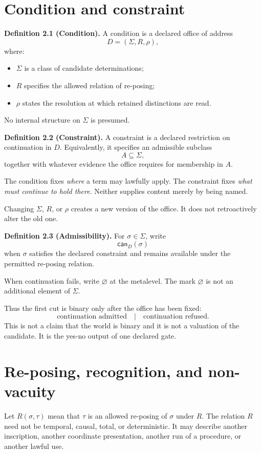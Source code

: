 \documentclass[11pt]{article}
\newcommand{\can}{\mathsf{can}}
\newcommand{\Refuse}{\varnothing}
\begin{document}
\section{Condition and constraint}

\textbf{Definition 2.1 (Condition).}
A condition is a declared office of address
\[
D=(\Sigma,R,\rho),
\]
where:
\begin{itemize}
\item $\Sigma$ is a class of candidate determinations;
\item $R$ specifies the allowed relation of re-posing;
\item $\rho$ states the resolution at which retained distinctions are read.
\end{itemize}
No internal structure on $\Sigma$ is presumed.

\textbf{Definition 2.2 (Constraint).}
A constraint is a declared restriction on continuation in $D$. Equivalently, it specifies an admissible subclass
\[
A\subseteq\Sigma,
\]
together with whatever evidence the office requires for membership in $A$.

The condition fixes \emph{where} a term may lawfully apply. The constraint fixes \emph{what must continue to hold there}. Neither supplies content merely by being named.

Changing $\Sigma$, $R$, or $\rho$ creates a new version of the office. It does not retroactively alter the old one.

\textbf{Definition 2.3 (Admissibility).}
For $\sigma\in\Sigma$, write
\[
\can_D(\sigma)
\]
when $\sigma$ satisfies the declared constraint and remains available under the permitted re-posing relation.

When continuation fails, write $\Refuse$ at the metalevel. The mark $\Refuse$ is not an additional element of $\Sigma$.

Thus the first cut is binary only after the office has been fixed:
\[
\boxed{\text{continuation admitted}\quad|\quad\text{continuation refused}.}
\]
This is not a claim that the world is binary and it is not a valuation of the candidate. It is the yes-no output of one declared gate.

\section{Re-posing, recognition, and non-vacuity}

Let $R(\sigma,\tau)$ mean that $\tau$ is an allowed re-posing of $\sigma$ under $R$. The relation $R$ need not be temporal, causal, total, or deterministic. It may describe another inscription, another coordinate presentation, another run of a procedure, or another lawful use.
\end{document}
